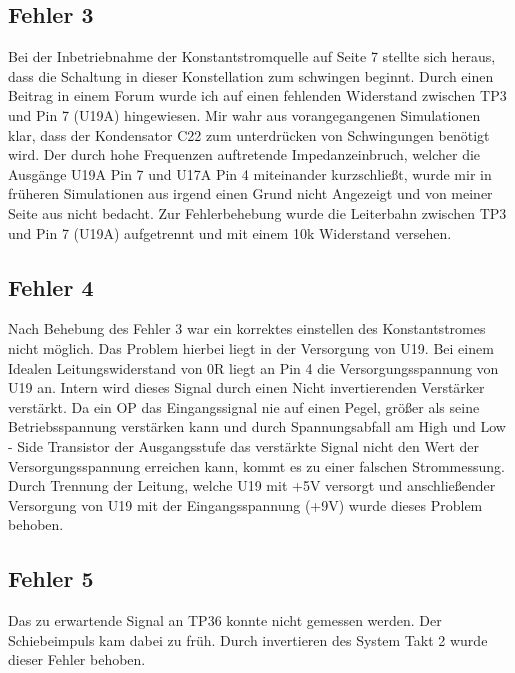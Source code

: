 \documentclass[a4paper,11pt]{scrartcl}
\begin{document}
\subsection{Fehler 3}

Bei der Inbetriebnahme der Konstantstromquelle auf Seite 7 stellte sich heraus, dass die Schaltung in dieser Konstellation zum schwingen beginnt. Durch einen Beitrag in einem Forum wurde ich auf einen fehlenden Widerstand zwischen TP3 und Pin 7 (U19A) hingewiesen. Mir wahr aus vorangegangenen Simulationen klar, dass der Kondensator C22 zum unterdrücken von Schwingungen benötigt wird. Der durch hohe Frequenzen auftretende Impedanzeinbruch, welcher die Ausgänge U19A Pin 7 und U17A Pin 4 miteinander kurzschließt, wurde mir in früheren Simulationen aus irgend einen Grund nicht Angezeigt und von meiner Seite aus nicht bedacht. Zur Fehlerbehebung wurde die Leiterbahn zwischen TP3 und Pin 7 (U19A) aufgetrennt und mit einem 10k Widerstand versehen. 


\subsection{Fehler 4}

Nach Behebung des \glqq Fehler 3 \grqq{} war ein korrektes einstellen des Konstantstromes nicht möglich. Das Problem hierbei liegt in der Versorgung von U19. Bei einem Idealen Leitungswiderstand von 0R liegt an Pin 4 die Versorgungsspannung von U19 an. Intern wird dieses Signal durch einen \glqq Nicht invertierenden Verstärker \grqq{} verstärkt. Da ein OP das Eingangssignal nie auf einen Pegel, größer als seine Betriebsspannung verstärken kann und durch Spannungsabfall am \glqq High und Low - Side Transistor \grqq{} der Ausgangsstufe das verstärkte Signal nicht den Wert der Versorgungsspannung erreichen kann, kommt es zu einer falschen Strommessung. Durch Trennung der Leitung, welche U19 mit +5V versorgt und anschließender Versorgung von U19 mit der Eingangsspannung (+9V) wurde dieses Problem behoben. 


\subsection{Fehler 5}

Das zu erwartende Signal an TP36 konnte nicht gemessen werden. Der Schiebeimpuls kam dabei zu früh. Durch invertieren des \glqq System Takt 2 \grqq{} wurde dieser Fehler behoben.
\end{document}
